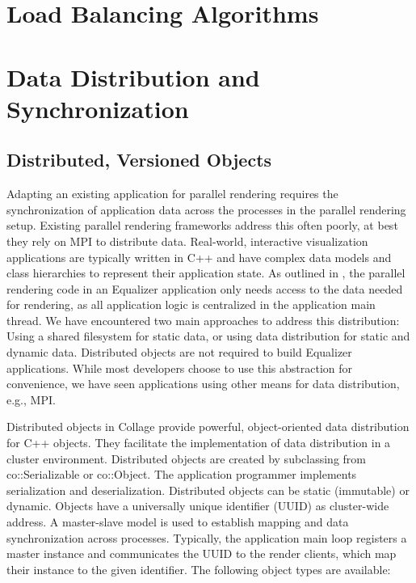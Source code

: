 \chapter{Load Balancing Algorithms}


\chapter{Data Distribution and Synchronization}


\section{Distributed, Versioned Objects}

Adapting an existing application for parallel rendering requires the
synchronization of application data across the processes in the parallel
rendering setup. Existing parallel rendering frameworks address this often
poorly, at best they rely on MPI to distribute data. Real-world, interactive
visualization applications are typically written in C++ and have complex data
models and class hierarchies to represent their application state. As outlined
in \cite{EMP:09}, the parallel rendering code in an \textsf{Equalizer}
application only needs access to the data needed for rendering, as all
application logic is centralized in the application main thread. We have
encountered two main approaches to address this distribution: Using a shared
filesystem for static data, or using data distribution for static and dynamic
data. Distributed objects are not required to build \textsf{Equalizer}
applications. While most developers choose to use this abstraction for
convenience, we have seen applications using other means for data distribution,
e.g., MPI.

Distributed objects in \textsf{Collage} provide powerful, object-oriented data
distribution for C++ objects. They facilitate the implementation of data
distribution in a cluster environment. Distributed objects are created by
subclassing from \textsf{co::Serializable} or \textsf{co::Object}. The
application programmer implements serialization and deserialization. Distributed
objects can be static (immutable) or dynamic. Objects have a universally unique
identifier (UUID) as cluster-wide address. A master-slave model is used to
establish mapping and data synchronization across processes. Typically, the
application main loop registers a master instance and communicates the UUID to
the render clients, which map their instance to the given identifier. The
following object types are available:

